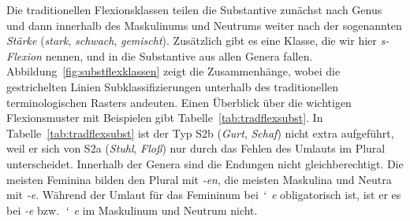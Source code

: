 Die traditionellen Flexionsklassen teilen die Substantive zunächst nach Genus und dann innerhalb des Maskulinums und Neutrums weiter nach der sogenannten \textit{Stärke} (\textit{stark}, \textit{schwach}, \textit{gemischt}).
Zusätzlich gibt es eine Klasse, die wir hier \textit{s-Flexion} nennen, und in die Substantive aus allen Genera fallen.
Abbildung~\ref{fig:substflexklassen} zeigt die Zusammenhänge, wobei die gestrichelten Linien Subklassifizierungen unterhalb des traditionellen terminologischen Rasters andeuten.
Einen Überblick über die wichtigen Flexionsmuster mit Beispielen gibt Tabelle~\ref{tab:tradflexsubst}.
In Tabelle~\ref{tab:tradflexsubst} ist der Typ S2b (\textit{Gurt}, \textit{Schaf}) nicht extra aufgeführt, weil er sich von S2a (\textit{Stuhl}, \textit{Floß}) nur durch das Fehlen des Umlauts im Plural unterscheidet.
Innerhalb der Genera sind die Endungen nicht gleichberechtigt.
Die meisten Feminina bilden den Plural mit \textit{-en}, die meisten Maskulina und Neutra mit \textit{-e}.
Während der Umlaut für das Femininum bei \textit{\char`~e} obligatorisch ist, ist er es bei \textit{-e} bzw.\ \textit{\char`~e} im Maskulinum und Neutrum nicht.


